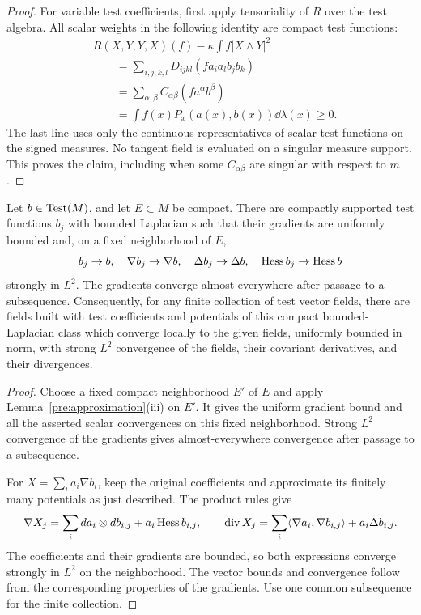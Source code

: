 \begin{proof}
For variable test coefficients, first apply tensoriality of
\(R\) over the test algebra. All scalar weights in the following
identity are compact test functions:
\[
 \begin{split}
 &R(X,Y,Y,X)(f)-\kappa\int f|X\wedge Y|^2\\
 &\qquad=\sum_{i,j,k,l}D_{ijkl}(fa_i a_l b_j b_k)\\
 &\qquad=\sum_{\alpha,\beta}C_{\alpha\beta}(fa^\alpha b^\beta)\\
 &\qquad=\int f(x)P_x(a(x),b(x))\dd\lambda(x)\geq0.
 \end{split}
\]
The last line uses only the continuous representatives of scalar
test functions on the signed measures. No tangent field is
evaluated on a singular measure support. This proves the claim,
including when some \(C_{\alpha\beta}\) are singular with
respect to \(m\).
\end{proof}

\begin{lemma}
\label{fwd:field-approximation}
Let \(b\in\operatorname{Test}(M)\), and let \(E\subset M\) be compact. There are
compactly supported test functions \(b_j\) with bounded Laplacian
such that their gradients are uniformly bounded and, on a fixed
neighborhood of \(E\),
\[
 b_j\to b,\quad\nabla b_j\to\nabla b,\quad
 \Delta b_j\to\Delta b,\quad \operatorname{Hess} b_j\to\operatorname{Hess} b
\]
strongly in \(L^2\). The gradients converge almost everywhere
after passage to a subsequence.
Consequently, for any finite collection of test vector fields,
there are fields built with test coefficients and potentials of
this compact bounded-Laplacian class which converge locally to the
given fields, uniformly bounded in norm, with strong \(L^2\)
convergence of the fields, their covariant derivatives, and their
divergences.
\end{lemma}

\begin{proof}
Choose a fixed compact neighborhood \(E'\) of \(E\) and apply
Lemma~\ref{pre:approximation}\textup{(iii)} on \(E'\).
It gives the uniform gradient bound and all the asserted scalar
convergences on this fixed neighborhood. Strong \(L^2\)
convergence of the gradients gives almost-everywhere convergence
after passage to a subsequence.

For \(X=\sum_i a_i\nabla b_i\), keep the original coefficients
and approximate its finitely many potentials as just described.
The product rules give
\[
 \nabla X_j=\sum_i da_i\otimes db_{i,j}+a_i\operatorname{Hess} b_{i,j},
 \qquad
 \operatorname{div}X_j
 =\sum_i\langle\nabla a_i,\nabla b_{i,j}\rangle+a_i\Delta b_{i,j}.
\]
The coefficients and their gradients are bounded, so both
expressions converge strongly in \(L^2\) on the neighborhood.
The vector bounds and convergence follow from the corresponding
properties of the gradients. Use one common subsequence for the
finite collection.
\end{proof}

